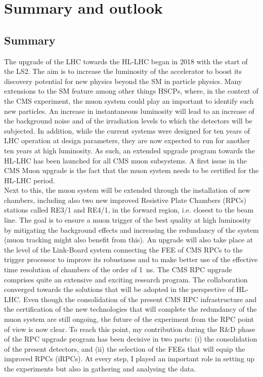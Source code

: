 \renewcommand\evenpagerightmark{{\scshape\small Chapter 7}}
\renewcommand\oddpageleftmark{{\scshape\small Summary and outlook}}

\hyphenation{}

\chapter[Summary and outlooks]{Summary and outlook}
\label{chapt7}

	\section{Summary}
	\label{chapt7:sec:summary}
	
	The upgrade of the \acf{LHC} towards the \acf{HL-LHC} began in 2018 with the start of the \acf{LS2}. The aim is to increase the luminosity of the accelerator to boost its discovery potential for new physics beyond the \acf{SM} in particle physics. Many extensions to the SM feature among other things \acf{HSCPs}, where, in the context of the \acf{CMS} experiment, the muon system could play an important to identify such new particles. An increase in instantaneous luminosity will lead to an increase of the background noise and of the irradiation levels to which the detectors will be subjected. In addition, while the current systems were designed for ten years of LHC operation at design parameters, they are now expected to run for another ten years at high luminosity. As such, an extended upgrade program towards the HL-LHC has been launched for all CMS muon subsystems. A first issue in the CMS Muon upgrade is the fact that the muon system needs to be certified for the HL-LHC period.\\
	Next to this, the muon system will be extended through the installation of new chambers, including also two new improved Resistive Plate Chambers (RPCs) stations called RE3/1 and RE4/1, in the forward region, i.e. closest to the beam line. The goal is to ensure a muon trigger of the best quality at high luminosity by mitigating the background effects and increasing the redundancy of the system (muon tracking might also benefit from this). An upgrade will also take place at the level of the Link-Board system connecting the \acf{FEE} of CMS RPCs to the trigger processor to improve its robustness and to make better use of the effective time resolution of chambers of the order of \SI{1}{ns}. The CMS RPC upgrade comprises quite an extensive and exciting research program. The collaboration converged towards the solutions that will be adopted in the perspective of HL-LHC. Even though the consolidation of the present CMS RPC infrastructure and the certification of the new technologies that will complete the redundancy of the muon system are still ongoing, the future of the experiment from the RPC point of view is now clear. To reach this point, my contribution during the R\&D phase of the RPC upgrade program has been decisive in two parts: (i) the consolidation of the present detectors, and (ii) the selection of the FEEs that will equip the improved RPCs (iRPCs). At every step, I played an important role in setting up the experiments but also in gathering and analysing the data.\\
